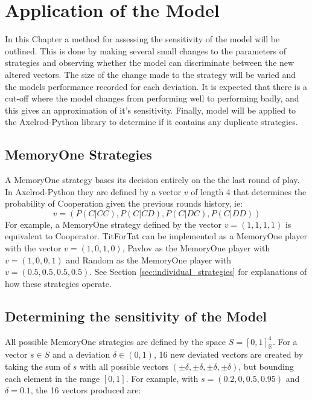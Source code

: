 
\chapter{Application of the Model}\label{cha:applying-model}

In this Chapter a method for assessing the sensitivity of the model will be outlined.
This is done by making several small changes to the parameters of strategies and observing whether the model can discriminate between the new altered vectors.
The size of the change made to the strategy will be varied and the models performance recorded for each deviation.
It is expected that there is a cut-off where the model changes from performing well to performing badly, and this gives an approximation of it's sensitivity.
Finally, model will be applied to the Axelrod-Python library to determine if it contains any duplicate strategies.



\section{MemoryOne Strategies}

A MemoryOne strategy bases its decision entirely on the the last round of play.
In Axelrod-Python they are defined by a vector $v$ of length 4 that determines the probability of Cooperation given the previous rounds history, ie:
$$
v = (P(C|CC), P(C|CD), P(C|DC), P(C|DD))
$$
For example, a MemoryOne strategy defined by the vector $v=(1, 1, 1, 1)$ is equivalent to Cooperator.
TitForTat can be implemented as a MemoryOne player with the vector $v=(1, 0, 1, 0)$, Pavlov as the MemoryOne player with $v=(1, 0, 0, 1)$ and Random as the MemoryOne player with $v=(0.5, 0.5, 0.5, 0.5)$.
See Section \ref{sec:individual_strategies} for explanations of how these strategies operate.



\section{Determining the sensitivity of the Model}

All possible MemoryOne strategies are defined by the space $S = [0, 1]^4_{\mathbb{R}}$.
For a vector $s \in S$ and a deviation $\delta \in (0, 1)$, 16 new deviated vectors are created by taking the sum of $s$ with all possible vectors $(\pm \delta, \pm \delta, \pm \delta, \pm \delta)$, but bounding each element in the range $[0, 1]$.
For example, with $s = (0.2, 0, 0.5, 0.95)$ and $\delta = 0.1$, the 16 vectors produced are:

